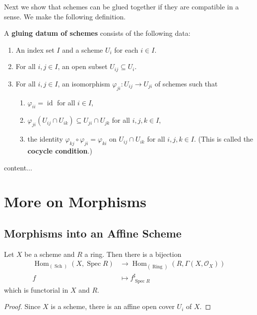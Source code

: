 \documentclass[12pt]{book}
\newcommand{\inlinedef}[1]{\textcolor{oxfordblue}{\bfseries #1}}
\theoremstyle{definition}
\newcommand{\Hom}{\operatorname{Hom}}
\newcommand{\id}{\operatorname{id}}
\DeclareMathOperator{\Spec}{Spec}
\newcommand{\Rings}{\operatorname{Ring}}
\newcommand{\Schs}{\operatorname{Sch}}
\begin{document}
	Next we show that schemes can be glued together if they are compatible in a sense. We make the following definition.
	\begin{definition}
		A \inlinedef{gluing datum of schemes} consists of the following data:
		\begin{enumerate}
			\item An index set $I$ and a scheme $U_i$ for each $i \in I$.
			\item For all $i, j \in I$, an open subset $U_{ij} \subseteq U_i$.
			\item For all $i, j \in I$, an isomorphism $\varphi_{ji} \colon U_{ij} \to U_{ji}$ of schemes such that
			\begin{enumerate}
				\item $\varphi_{ii} = \id$ for all $i \in I$,
				\item $\varphi_{ji}(U_{ij} \cap U_{ik}) \subseteq U_{ji} \cap U_{jk}$ for all $i, j, k \in I$,
				\item the identity $\varphi_{kj} \circ \varphi_{ji} = \varphi_{ki}$ on $U_{ij} \cap U_{ik}$ for all $i, j, k \in I$. (This is called the \inlinedef{cocycle condition}.)
			\end{enumerate}
		\end{enumerate}
	\end{definition}
	\begin{lemma}
		content...
	\end{lemma}
	

	
	\section{More on Morphisms}
	\subsection*{Morphisms into an Affine Scheme}
	
	\begin{theorem}
		Let $X$ be a scheme and $R$ a ring. Then there is a bijection
		\begin{align*}
			\Hom_{(\Schs)}(X, \Spec R) & \longrightarrow \Hom_{(\Rings)}(R, \Gamma(X, \mathcal{O}_X)) \\
			f & \longmapsto f^\sharp_{\Spec R}
		\end{align*}
		which is functorial in $X$ and $R$.
	\end{theorem}
	
	\begin{proof}
		Since $X$ is a scheme, there is an affine open cover $U_i$ of $X$.
	\end{proof}
	
\end{document}
